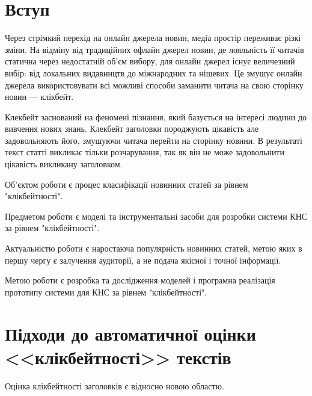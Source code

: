 




\usepackage{lastpage}
\usepackage{calc}
\usepackage{soul}
\usepackage{pbox}
\usepackage{ulem}
\usepackage{titling}
\usepackage{framed}
\usepackage{tabu}
\usepackage{lscape}
\usepackage{appendix}
\usepackage{pdflscape}
\usepackage{longtable}
\usepackage[figure,table]{totalcount}

\graphicspath{{figures/}}



\Ukrainian

\addtocounter{page}{1}


\section*{Вступ}
Через стрімкий перехід на онлайн джерела новин, медіа простір переживає різкі зміни.
На відміну від традиційних офлайн джерел новин, де лояльність її читачів статична через недостатній об'єм вибору, для онлайн джерел існує величезний вибір: від локальних видавництв до міжнародних та нішевих.
Це змушує онлайн джерела використовувати всі можливі способи заманити читача на свою сторінку новин --- клікбейт.

Клекбейт заснований на феномені пізнання, який базується на інтересі людини до вивчення нових знань. Клекбейт заголовки породжують цікавість але задовольняють його, змушуючи читача перейти на сторінку новини.
В результаті текст статті викликає тільки розчарування, так як він не може задовольнити цікавість викликану заголовком.

Об'єктом роботи є процес класифікації новинних статей за рівнем "клікбейтності".

Предметом роботи є моделі та інструментальні засоби для розробки системи КНС за рівнем "клікбейтності".

Актуальністю роботи є наростаюча популярність новинних статей, метою яких в першу чергу є залучення аудиторії, а не подача якісної і точної інформації.

Метою роботи є розробка та дослідження моделей і програмна реалізація прототипу системи для КНС за рівнем "клікбейтності".

\section{Підходи до автоматичної оцінки <<клікбейтності>> текстів}
Оцінка клікбейтності заголовків є відносно новою областю. 


